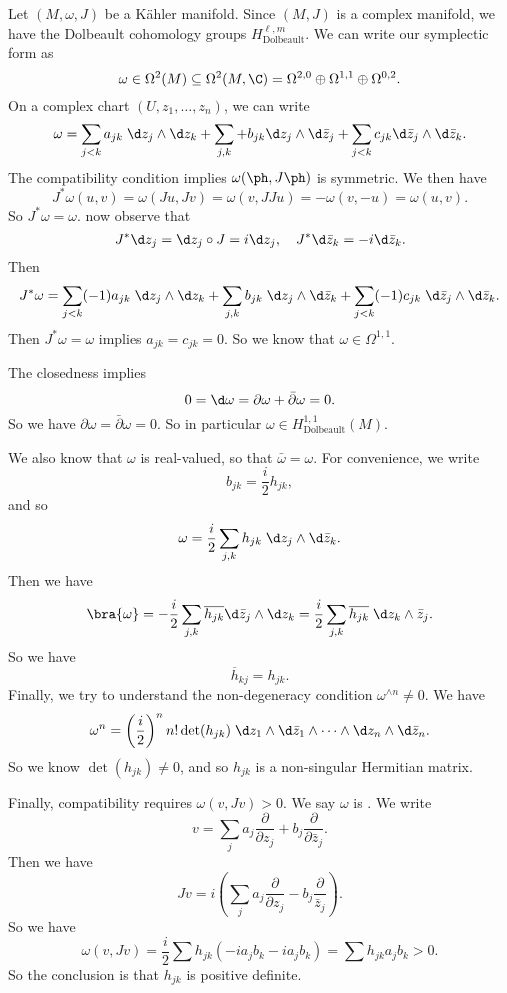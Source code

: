 \documentclass[a4paper]{article}
\newcommand\Dolb{\mathrm{Dolbeault}}
\begin{document}
Let $(M, \omega, J)$ be a K\"ahler manifold. Since $(M, J)$ is a complex manifold, we have the Dolbeault cohomology groups $H^{\ell, m}_{\Dolb}$. We can write our symplectic form as
\[
  \omega \in \Omega^2(M) \subseteq \Omega^2(M, \C) = \Omega^{2, 0} \oplus \Omega^{1, 1} \oplus \Omega^{0, 2}.
\]
On a complex chart $(U, z_1, \ldots, z_n)$, we can write
\[
  \omega = \sum_{j < k} a_{jk} \;\d z_j \wedge \d z_k + \sum_{j, k} + b_{jk} \d z_j \wedge \d \bar{z}_j + \sum_{j < k} c_{jk} \d \bar{z}_j \wedge \d \bar{z}_k.
\]
The compatibility condition implies $\omega(\ph, J\ph)$ is symmetric. We then have
\[
  J^* \omega(u, v) = \omega(Ju, Jv) = \omega(v, JJu) = - \omega(v, -u) = \omega(u, v).
\]
So $J^* \omega = \omega$. now observe that
\[
  J^* \d z_j = \d z_j \circ J = i \d z_j,\quad J^* \d \bar{z}_k = - i \d \bar{z}_k.
\]
Then
\[
  J^* \omega = \sum_{j < k}(-1) a_{jk}\; \d z_j \wedge \d z_k + \sum_{j, k} b_{jk}\; \d z_j \wedge \d \bar{z}_k + \sum_{j < k} (-1) c_{jk} \;\d \bar{z}_j \wedge \d \bar{z}_k.
\]
Then $J^* \omega = \omega$ implies $a_{jk} = c_{jk} = 0$. So we know that $\omega \in \Omega^{1, 1}$.

The closedness implies
\[
  0 = \d \omega = \partial \omega + \bar{\partial} \omega = 0.
\]
So we have $\partial \omega = \bar{\partial} \omega = 0$. So in particular $\omega \in H^{1, 1}_{\Dolb}(M)$.

We also know that $\omega$ is real-valued, so that $\bar{\omega} = \omega$. For convenience, we write
\[
  b_{jk} = \frac{i}{2} h_{jk},
\]
and so
\[
  \omega = \frac{i}{2} \sum_{j, k} h_{jk} \;\d z_j \wedge \d \bar{z}_k.
\]
Then we have
\[
  \bra{\omega} = -\frac{i}{2} \sum_{j, k}\overline{h_{jk}} \d \bar{z}_j \wedge \d z_k = \frac{i}{2} \sum_{j, k} \overline{h_{jk}} \;\d z_k \wedge \bar{z}_j.
\]
So we have
\[
  \overline{h}_{kj} = h_{jk}.
\]
Finally, we try to understand the non-degeneracy condition $\omega^{\wedge n} \not= 0$. We have
\[
  \omega^n = \left(\frac{i}{2}\right)^n n! \det(h_{jk}) \;\d z_1 \wedge \d \bar{z}_1 \wedge \cdots \wedge \d z_n \wedge \d \bar{z}_n.
\]
So we know $\det(h_{jk}) \not= 0$, and so $h_{jk}$ is a non-singular Hermitian matrix.

Finally, compatibility requires $\omega(v, Jv) > 0$. We say $\omega$ is . We write
\[
  v = \sum_j a_j \frac{\partial}{\partial z_j} + b_j \frac{\partial}{\partial \bar{z}_j}.
\]
Then we have
\[
  Jv = i \left(\sum_j a_j \frac{\partial}{\partial z_j} - b_j \frac{\partial}{\bar{z}_j}\right).
\]
So we have
\[
  \omega(v, Jv) = \frac{i}{2} \sum h_{jk} (-ia_j b_k - ia_j b_k) = \sum h_{jk} a_j b_k > 0.
\]
So the conclusion is that $h_{jk}$ is positive definite.
\end{document}
